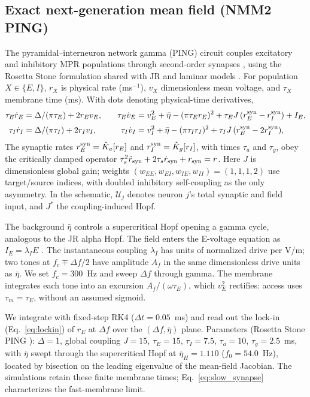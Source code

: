 \subsection{Exact next-generation mean field (NMM2 PING)}\label{sec:nmm2-methods}
The pyramidal--interneuron network gamma (PING) circuit couples excitatory
and inhibitory MPR populations through second-order synapses
\cite{montbrio2015,ruffini2021nmm2,clusella2023}, using the Rosetta Stone
formulation shared with JR and laminar models \cite{ruffini2025rosetta}.
For population $X\in\{E,I\}$, $r_X$ is physical rate (ms$^{-1}$),
$v_X$ dimensionless mean voltage, and $\tau_X$ membrane time (ms).
With dots denoting physical-time derivatives,
\begin{equation}
\begin{aligned}
\tau_E\dot r_E&=\Delta/(\pi\tau_E)+2r_Ev_E, &\quad
\tau_E\dot v_E&=v_E^2+\bar\eta-(\pi\tau_E r_E)^2+\tau_E J\,(r_E^{\rm syn}-r_I^{\rm syn})+I_E,\\[2pt]
\tau_I\dot r_I&=\Delta/(\pi\tau_I)+2r_Iv_I, &\quad
\tau_I\dot v_I&=v_I^2+\bar\eta-(\pi\tau_I r_I)^2+\tau_I J\,(r_E^{\rm syn}-2r_I^{\rm syn}),
\end{aligned}
\label{eq:nmm2-ping}
\end{equation}
The synaptic rates $r_E^{\rm syn}=\hat K_a[r_E]$ and
$r_I^{\rm syn}=\hat K_g[r_I]$, with times $\tau_a$ and $\tau_g$,
obey the critically damped operator
$\tau_s^2\ddot r_{\rm syn}+2\tau_s\dot r_{\rm syn}+r_{\rm syn}=r$.
Here $J$ is dimensionless global gain; weights
$(w_{EE},w_{EI},w_{IE},w_{II})=(1,1,1,2)$ use target/source indices,
with doubled inhibitory self-coupling as the only asymmetry.
In the schematic, $\mathcal U_j$ denotes neuron $j$'s total synaptic
and field input, and $J^*$ the coupling-induced Hopf.

The background $\bar\eta$ controls a supercritical Hopf opening a gamma
cycle, analogous to the JR alpha Hopf. The field enters the E-voltage
equation as $I_E=\lambda_I E$ \cite{ruffini2021nmm2}.
The instantaneous coupling $\lambda_I$ has units of normalized drive per V/m;
two tones at $f_c\mp\Delta f/2$ have amplitude $A_f$ in the same
dimensionless drive units as $\bar\eta$. We set $f_c=300$~Hz and sweep
$\Delta f$ through gamma. The membrane integrates each tone into an
excursion $A_f/(\omega\tau_E)$, which $v_E^2$ rectifies: access uses
$\tau_m=\tau_E$, without an assumed sigmoid.

We integrate with fixed-step RK4 ($\Delta t=0.05$~ms) and read out the lock-in
(Eq.~\eqref{eq:lockin}) of $r_E$ at $\Delta f$ over the $(\Delta f, \bar\eta)$ plane.
Parameters (Rosetta Stone PING \cite{ruffini2025rosetta}): $\Delta=1$, global coupling
$J=15$, $\tau_E=15$, $\tau_I=7.5$, $\tau_a=10$, $\tau_g=2.5$~ms, with $\bar\eta$ swept
through the supercritical Hopf at $\bar\eta_H=1.110$ ($f_0=54.0$~Hz), located by bisection
on the leading eigenvalue of the mean-field Jacobian. The simulations retain these
finite membrane times; Eq.~\eqref{eq:slow_synapse} characterizes the fast-membrane limit.

